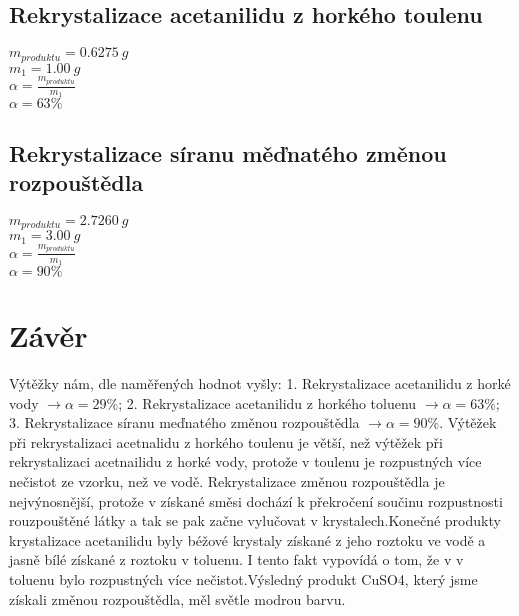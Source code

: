 \documentclass[13pt, a4paper, twoside]{article}
\begin{document}
    \subsection*{Rekrystalizace acetanilidu z horkého toulenu}
    \begin{center}
    \begin{multicols}{2}
        \noindent$m_{produktu}=0.6275\: g$\\
        $m_1=1.00\:g$\\
        $\alpha=\frac{m_{produktu}}{m_1}$\\
        $\alpha=63\%$
    \end{multicols}
    \end{center}
    \subsection*{Rekrystalizace síranu měďnatého změnou rozpouštědla}
    \begin{center}
    \begin{multicols}{2}
        \noindent$m_{produktu}=2.7260\: g$\\
        $m_1=3.00\:g$\\
        $\alpha=\frac{m_{produktu}}{m_1}$\\
        $\alpha=90\%$
    \end{multicols}
    \end{center}

    \section*{Závěr}
    Výtěžky nám, dle naměřených hodnot vyšly: 1. Rekrystalizace acetanilidu z horké vody
    $\to \alpha=29\%$; 2. Rekrystalizace acetanilidu z horkého toluenu $\to \alpha=63\%$;
    3. Rekrystalizace síranu meďnatého změnou rozpouštědla $\to \alpha=90\%$. Výtěžek při rekrystalizaci acetnalidu z horkého toulenu je větší, než
    výtěžek při rekrystalizaci acetnailidu z horké vody, protože v toulenu
    je rozpustných více nečistot ze vzorku, než ve vodě. Rekrystalizace změnou rozpouštědla je nejvýnosnější, protože v získané směsi dochází k překročení součinu rozpustnosti
    rouzpouštěné látky a tak se pak začne vylučovat v krystalech.Konečné produkty krystalizace acetanilidu byly béžové krystaly získané z jeho roztoku ve vodě a jasně bílé získané z roztoku v toluenu. I tento fakt vypovídá o tom, že v v toluenu bylo rozpustných více nečistot.Výsledný produkt CuSO4, který jsme získali změnou rozpouštědla, měl světle modrou barvu.
\end{document}
